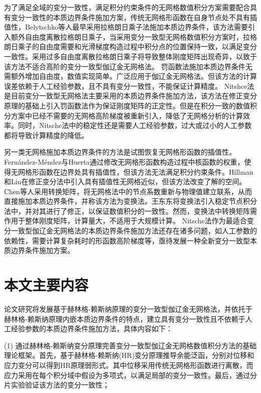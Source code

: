 为了满足全域的变分一致性，满足积分约束条件的无网格数值积分方案需要配合具有变分一致性的本质边界条件施加方案，传统无网格形函数在自身节点处不具有插值性，Belytschko等人\cite{belytschko1994}最早采用拉格朗日乘子法施加本质边界条件，该方法需要引入额外自由度离散拉格朗日乘子，当采用变分一致型无网格数值积分方案时，拉格朗日乘子的自由度需要和光滑梯度构造过程中积分点的位置保持一致，以满足变分一致性。采用过多自由度离散拉格朗日乘子将导致整体刚度矩阵出现奇异，以致于该方法不适合高阶的变分一致型伽辽金无网格法。
罚函数法\cite{zhu1998}施加本质边界条件无需额外增加自由度，数值实现简单。广泛应用于伽辽金无网格法。但该方法的计算误差依赖于人工经验参数，且不具有变分一致性，不能保证计算精度。
Nitshce法\cite{fernandez-mendez2004}是目前变分一致型无网格法主要采用的本质边界条件施加方法，该方法在修正变分原理的基础上引入罚函数法作为保证刚度矩阵的正定性。但是在积分一致的数值积分方案中已经不需要的无网格高阶梯度被重新引入，降低了无网格分析的计算效率。同时，Nitsche法中的稳定性还是需要人工经验参数，过大或过小的人工参数都将导致计算精度的降低。

另一类无网格施加本质边界条件的方法是试图恢复无网格形函数的插值性。Fernández-Méndez与Huerta\cite{fernandez-mendez2004}通过修改无网格形函数构造过程中核函数的权重，使得无网格形函数在边界处具有插值性，但该方法无法满足积分约束条件。Hillman和Lin\cite{hillman2021}在修正变分法中引入具有插值性无网格近似，但该方法改变了解的空间。Chen等人\cite{chen1996}采用转换矩阵，将无网格法中的节点系数重新与物理值建立联系，从而直接施加本质边界条件，并称该方法为变换法。王东东\cite{wang2015}将变换法引入稳定节点积分法中，并对其进行了修正，以保证数值积分的一致性。然而，变换法中转换矩阵需作用于整体刚度矩阵，计算量大，不适用于大规模计算。
Nitsche法作为最适合变分一致型伽辽金无网格法的本质边界条件施加方法还存在诸多问题，如人工参数的依赖性，需要计算复杂耗时的形函数高阶梯度等，亟待发展一种全新变分一致型本质边界条件施加方案。

\section{本文主要内容}

论文研究将发展基于赫林格-赖斯纳原理的变分一致型伽辽金无网格法，并依托于赫林格-赖斯纳原理内嵌本质边界条件的特点，建立具有变分一致性且不依赖于人工经验参数的本质边界条件施加方法，具体内容如下：

(1) 通过赫林格-赖斯纳变分原理完善变分一致型伽辽金无网格数值积分方法的基础理论框架。首先，基于赫林格-赖斯纳(HR)变分原理推导余能泛函，分别对位移和应力变分可以得到HR原理弱形式。其中位移采用传统无网格形函数进行离散，而应力采用在每个积分域中假设为多项式，以满足局部的变分一致性。最后，通过分片实验验证该方法的变分一致性；

